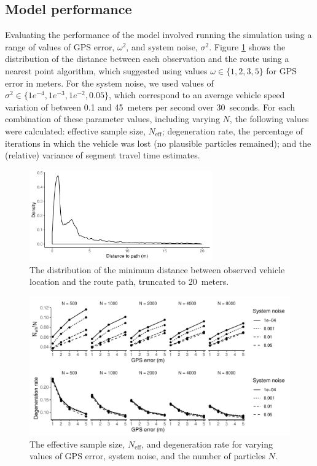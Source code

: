 \subsection{Model performance}
\label{sec:model_perf}


Evaluating the performance of the model involved
running the simulation using a range of values of GPS error, $\omega^2$,
and system noise, $\sigma^2$.
Figure \ref{fig:dist_to_route} shows the distribution of the distance
between each observation and the route using a nearest point algorithm,
which suggested using values $\omega \in \{1,2,3,5\}$ for GPS error in meters.
For the system noise, we used values of $\sigma^2\in \{1e^{-4},1e^{-3},1e^{-2},0.05\}$,
which correspond to an average vehicle speed variation of between 0.1 and 45~meters per second
over 30~seconds.
For each combination of these parameter values, including varying $N$,
the following values were calculated:
effective sample size, $N_\text{eff}$;
degeneration rate, the percentage of iterations in which the vehicle was lost
(no plausible particles remained);
and the (relative) variance of segment travel time estimates.


\begin{figure}[tb]
    \centering
    \includegraphics[width=0.7\textwidth]{figures/04_model_results_dist.pdf}
    \caption{
        The distribution of the minimum distance between observed vehicle location
        and the route path, truncated to 20~meters.
    }
    \label{fig:dist_to_route}
\end{figure}


\begin{figure}[tb]
    \centering
    \includegraphics[width=\textwidth]{figures/04_model_results_neff.pdf}
    \caption{
        The effective sample size, $N_\text{eff}$,
        and degeneration rate for varying values of GPS error,
        system noise, and the number of particles $N$.
    }
    \label{fig:perf_stats}
\end{figure}


